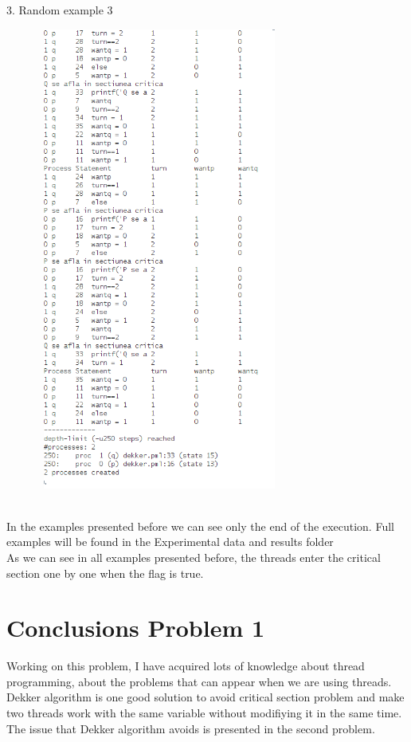 \documentclass[14pt]{article}
\begin{document}
\begin{center}
3. Random example 3
\vspace{10mm}

\includegraphics[height=6in, width = 4in]{dekker3.png}\\
\end{center}\\
In the examples presented before we can see only the end of the execution. Full examples will be found in the Experimental data and results folder\\
As we can see in all examples presented before, the threads enter the critical section one by one when the flag is true.


\section*{Conclusions Problem 1}
\vspace{10 mm}
Working on this problem, I have acquired lots of knowledge about thread programming, about the problems that can appear when we are using threads. Dekker algorithm is one good solution to avoid critical section problem and make two threads work with the same variable without modifiying it in the same time. The issue that Dekker algorithm avoids is presented in the second problem.
\newpage
\end{document}
